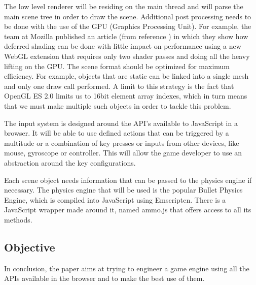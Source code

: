 The low level renderer will be residing on the main thread and will parse the main scene tree in order to draw the scene. Additional post processing needs to be done with the use of the GPU (Graphics Processing Unit). For example, the team at Mozilla published an article (from reference \cite{tian14}) in which they show how deferred shading can be done with little impact on performance using a new WebGL extension that requires only two shader passes and doing all the heavy lifting on the GPU. The scene format should be optimized for maximum efficiency. For example, objects that are static can be linked into a single mesh and only one draw call performed. A limit to this strategy is the fact that OpenGL ES 2.0 limits us to 16bit element array indexes, which in turn means that we must make multiple such objects in order to tackle this problem.

The input system is designed around the API's available to JavaScript in a browser. It will be able to use defined actions that can be triggered by a multitude or a combination of key presses or inputs from other devices, like mouse, gyroscope or controller. This will allow the game developer to use an abstraction around the key configurations.

Each scene object needs information that can be passed to the physics engine if necessary. The physics engine that will be used is the popular Bullet Physics Engine, which is compiled into JavaScript using Emscripten. There is a JavaScript wrapper made around it, named ammo.js that offers access to all its methods.
 


\subsection{Objective}
\label{sub-sec:proj-desc-objective}

In conclusion, the paper aims at trying to engineer a game engine using all the APIs available in the browser and to make the best use of them.



